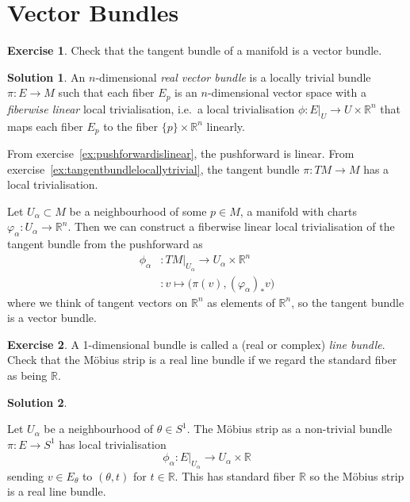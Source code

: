 \documentclass[11pt, a4paper]{report}
\theoremstyle{definition}
\newtheorem{exercise}{Exercise}[part]
\newtheorem{solution}{Solution}[part]
\newenvironment{ex}{\begin{exercise}}{\end{exercise}\pagebreak[1]}
\newenvironment{sol}{\begin{solution}}{\end{solution}\pagebreak[3]}
\begin{document}
\section{Vector Bundles}

\begin{ex}

Check that the tangent bundle of a manifold is a vector bundle.

\end{ex}

\begin{sol}

An $n$-dimensional \emph{real vector bundle} is a locally trivial bundle $\pi: E \to M$ such that each fiber $E_p$ is an $n$-dimensional vector space with a \emph{fiberwise linear} local trivialisation, i.e.\ a local trivialisation $\phi: E|_U \to U \times \mathbb{R}^n$ that maps each fiber $E_p$ to the fiber $\{p\} \times \mathbb{R}^n$ linearly.

From exercise~\ref{ex:pushforwardislinear}, the pushforward is linear.
From exercise~\ref{ex:tangentbundlelocallytrivial}, the tangent bundle $\pi: TM \to M$ has a local trivialisation.

Let $U_\alpha \subset M$ be a neighbourhood of some $p \in M$, a manifold with charts $\varphi_\alpha: U_\alpha \to \mathbb{R}^n$.
Then we can construct a fiberwise linear local trivialisation of the tangent bundle from the pushforward as
\begin{align*}
    \phi_\alpha &: TM|_{U_\alpha} \to U_\alpha \times \mathbb{R}^n \\
                &: v \mapsto \bigl( \pi(v), {(\varphi_\alpha)}_* v \bigr)
\end{align*}
where we think of tangent vectors on $\mathbb{R}^n$ as elements of $\mathbb{R}^n$,
so the tangent bundle is a vector bundle.

\end{sol}

\begin{ex}

A 1-dimensional bundle is called a (real or complex) \emph{line bundle}.
Check that the Möbius strip is a real line bundle if we regard the standard fiber as being $\mathbb{R}$.

\end{ex}

\begin{sol}\label{sol:reallinebundle}

Let $U_\alpha$ be a neighbourhood of $\theta \in S^1$.
The Möbius strip as a non-trivial bundle $\pi: E \to S^1$ has local trivialisation
\[
    \phi_\alpha: E|_{U_\alpha} \to U_\alpha \times \mathbb{R}
\]
sending $v \in E_\theta$ to $(\theta, t)$ for $t \in \mathbb{R}$.
This has standard fiber $\mathbb{R}$ so the Möbius strip is a real line bundle.

\end{sol}
\end{document}
